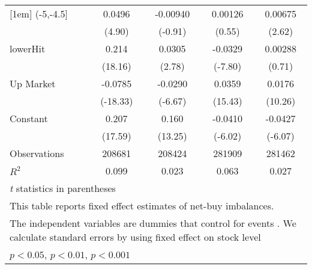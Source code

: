 {\begin{tabular}{l*{4}{c}}
[1em]
(-5,-4.5]           &      0.0496\sym{***}&    -0.00940         &     0.00126         &     0.00675\sym{**} \\
                    &      (4.90)         &     (-0.91)         &      (0.55)         &      (2.62)         \\
[1em]
lowerHit            &       0.214\sym{***}&      0.0305\sym{**} &     -0.0329\sym{***}&     0.00288         \\
                    &     (18.16)         &      (2.78)         &     (-7.80)         &      (0.71)         \\
[1em]
Up Market           &     -0.0785\sym{***}&     -0.0290\sym{***}&      0.0359\sym{***}&      0.0176\sym{***}\\
                    &    (-18.33)         &     (-6.67)         &     (15.43)         &     (10.26)         \\
[1em]
Constant            &       0.207\sym{***}&       0.160\sym{***}&     -0.0410\sym{***}&     -0.0427\sym{***}\\
                    &     (17.59)         &     (13.25)         &     (-6.02)         &     (-6.07)         \\
\hline
Observations        &      208681         &      208424         &      281909         &      281462         \\
\(R^{2}\)           &       0.099         &       0.023         &       0.063         &       0.027         \\
\hline\hline
\multicolumn{5}{l}{\footnotesize \textit{t} statistics in parentheses}\\
\multicolumn{5}{l}{\footnotesize This table reports fixed effect estimates of net-buy imbalances.}\\
\multicolumn{5}{l}{\footnotesize The independent variables are dummies that control for events . We calculate standard errors by using fixed effect on stock level}\\
\multicolumn{5}{l}{\footnotesize \sym{*} \(p<0.05\), \sym{**} \(p<0.01\), \sym{***} \(p<0.001\)}\\
\end{tabular}
}
